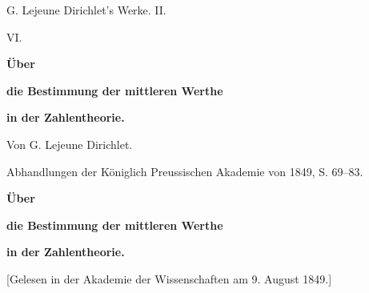 \documentclass[11pt]{article}
\begin{document}
\begin{center}
{\Large G. Lejeune Dirichlet's Werke. II.}\par\vspace{1.2em}
{\Large VI.}\par\vspace{0.5em}
{\LARGE \textbf{Über}}\par
{\LARGE \textbf{die Bestimmung der mittleren Werthe}}\par
{\LARGE \textbf{in der Zahlentheorie.}}\par\vspace{1em}
{\large Von G. Lejeune Dirichlet.}\par\vspace{0.5em}
{\small Abhandlungen der Königlich Preussischen Akademie von 1849, S. 69--83.}
\end{center}

\begin{center}
\textbf{Über}\par
\textbf{die Bestimmung der mittleren Werthe}\par
\textbf{in der Zahlentheorie.}\par
{\small [Gelesen in der Akademie der Wissenschaften am 9. August 1849\footnotemark.]}
\end{center}
\end{document}
